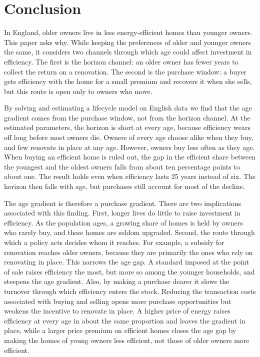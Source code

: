 \section{Conclusion}\label{sec:conclusion}

In England, older owners live in less energy-efficient homes than younger owners. This paper asks why. While keeping the preferences of older and younger owners the same, it considers two channels through which age could affect investment in efficiency. The first is the horizon channel: an older owner has fewer years to collect the return on a renovation. The second is the purchase window: a buyer gets efficiency with the home for a small premium and recovers it when she sells, but this route is open only to owners who move.


By solving and estimating a lifecycle model on English data we find that the age gradient comes
from the purchase window, not from the horizon channel. At the estimated parameters, the horizon is
short at every age, because efficiency wears off long before most owners die. Owners of every age
choose alike when they buy, and few renovate in place at any age. However, owners buy less often as they age. When buying an efficient home is
ruled out, the gap in the efficient share between the youngest and the
oldest owners falls from about ten percentage points to about one. The
result holds even when efficiency lasts 25 years instead of six. The horizon
then falls with age, but purchases still account for most of the decline.

The age gradient is therefore a purchase gradient.
There are two implications associated with this finding. First, longer lives do little to raise investment
in efficiency. As the population ages, a growing share of homes is held
by owners who rarely buy, and these homes are seldom upgraded. Second, the route
through which a policy acts decides whom it reaches. For example, a subsidy for
renovation reaches older owners, because they are primarily the ones who rely on
renovating in place. This narrows the age gap. A standard imposed at the
point of sale raises efficiency the most, but more so among the younger households, and steepens the age gradient. Also, by
making a purchase dearer it slows the turnover through which efficiency
enters the stock. Reducing the transaction costs associated with buying and selling opens more purchase opportunities but
weakens the incentive to renovate in place. A higher price of energy raises
efficiency at every age in about the same proportion and leaves the
gradient in place, while a larger price premium on efficient homes closes
the age gap by making the homes of young owners less efficient, not those
of older owners more efficient.


